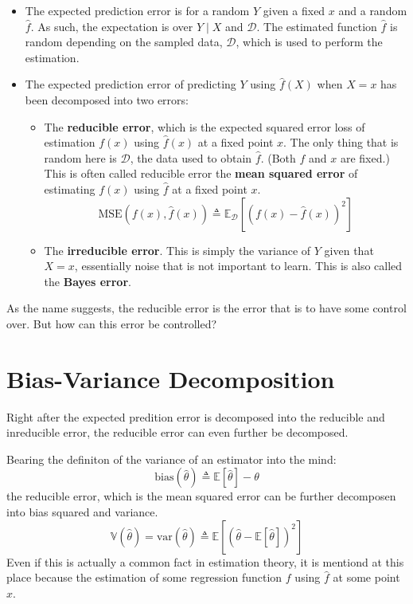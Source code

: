 \documentclass[]{report}
\providecommand{\tightlist}{%
  \setlength{\itemsep}{0pt}\setlength{\parskip}{0pt}}
\begin{document}
\begin{itemize}
\tightlist
\item
  The expected prediction error is for a random \(Y\) given a fixed
  \(x\) and a random \(\hat{f}\). As such, the expectation is over
  \(Y \mid X\) and \(\mathcal{D}\). The estimated function \(\hat{f}\)
  is random depending on the sampled data, \(\mathcal{D}\), which is
  used to perform the estimation.
\item
  The expected prediction error of predicting \(Y\) using \(\hat{f}(X)\)
  when \(X = x\) has been decomposed into two errors:

  \begin{itemize}
  \tightlist
  \item
    The \textbf{reducible error}, which is the expected squared error
    loss of estimation \(f(x)\) using \(\hat{f}(x)\) at a fixed point
    \(x\). The only thing that is random here is \(\mathcal{D}\), the
    data used to obtain \(\hat{f}\). (Both \(f\) and \(x\) are fixed.)
    This is often called reducible error the \textbf{mean squared error}
    of estimating \(f(x)\) using \(\hat{f}\) at a fixed point \(x\). \[
    \text{MSE}\left(f(x), \hat{f}(x)\right) \triangleq 
    \mathbb{E}_{\mathcal{D}} \left[  \left(f(x) - \hat{f}(x) \right)^2 \right]\]
  \item
    The \textbf{irreducible error}. This is simply the variance of \(Y\)
    given that \(X = x\), essentially noise that is not important to
    learn. This is also called the \textbf{Bayes error}.
  \end{itemize}
\end{itemize}

As the name suggests, the reducible error is the error that is to have
some control over. But how can this error be controlled?

\section{Bias-Variance Decomposition}\label{bias-variance-decomposition}

Right after the expected predition error is decomposed into the
reducible and inreducible error, the reducible error can even further be
decomposed.

Bearing the definiton of the variance of an estimator into the mind: \[
\text{bias}(\hat{\theta}) \triangleq \mathbb{E}\left[\hat{\theta}\right] - \theta
\] the reducible error, which is the mean squared error can be further
decomposen into bias squared and variance. \[
\mathbb{V}(\hat{\theta}) = \text{var}(\hat{\theta}) \triangleq \mathbb{E}\left [ ( \hat{\theta} -\mathbb{E}\left[\hat{\theta}\right] )^2 \right]
\] Even if this is actually a common fact in estimation theory, it is
mentiond at this place because the estimation of some regression
function \(f\) using \(\hat{f}\) at some point \(x\).
\end{document}
